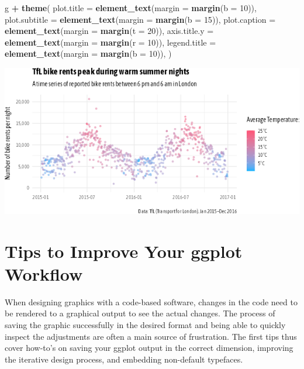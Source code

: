 \documentclass[
]{krantz}
\makeatletter
\newenvironment{Shaded}{\begin{snugshade}}{\end{snugshade}}
\newcommand{\AttributeTok}[1]{\textcolor[rgb]{0.27,0.27,0.27}{#1}}
\newcommand{\DecValTok}[1]{\textcolor[rgb]{0.06,0.06,0.06}{#1}}
\newcommand{\FunctionTok}[1]{\textcolor[rgb]{0.27,0.27,0.27}{\textbf{#1}}}
\newcommand{\NormalTok}[1]{#1}
\newcommand{\SpecialCharTok}[1]{\textcolor[rgb]{0.43,0.43,0.43}{\textbf{#1}}}
\newenvironment{kframe}{%
\medskip{}
\setlength{\fboxsep}{.8em}
 \def\at@end@of@kframe{}%
 \ifinner\ifhmode%
  \def\at@end@of@kframe{\end{minipage}}%
  \begin{minipage}{\columnwidth}%
 \fi\fi%
 \def\FrameCommand##1{\hskip\@totalleftmargin \hskip-\fboxsep
 \colorbox{shadecolor}{##1}\hskip-\fboxsep
     \hskip-\linewidth \hskip-\@totalleftmargin \hskip\columnwidth}%
 \MakeFramed {\advance\hsize-\width
   \@totalleftmargin\z@ \linewidth\hsize
   \@setminipage}}%
 {\par\unskip\endMakeFramed%
 \at@end@of@kframe}
\renewenvironment{Shaded}{\begin{kframe}}{\end{kframe}}
\makeatother
\begin{document}
\begin{Shaded}
\begin{Highlighting}[]
\NormalTok{g }\SpecialCharTok{+} \FunctionTok{theme}\NormalTok{(}
  \AttributeTok{plot.title =} \FunctionTok{element\_text}\NormalTok{(}\AttributeTok{margin =} \FunctionTok{margin}\NormalTok{(}\AttributeTok{b =} \DecValTok{10}\NormalTok{)),}
  \AttributeTok{plot.subtitle =} \FunctionTok{element\_text}\NormalTok{(}\AttributeTok{margin =} \FunctionTok{margin}\NormalTok{(}\AttributeTok{b =} \DecValTok{15}\NormalTok{)),}
  \AttributeTok{plot.caption =} \FunctionTok{element\_text}\NormalTok{(}\AttributeTok{margin =} \FunctionTok{margin}\NormalTok{(}\AttributeTok{t =} \DecValTok{20}\NormalTok{)),}
  \AttributeTok{axis.title.y =} \FunctionTok{element\_text}\NormalTok{(}\AttributeTok{margin =} \FunctionTok{margin}\NormalTok{(}\AttributeTok{r =} \DecValTok{10}\NormalTok{)),}
  \AttributeTok{legend.title =} \FunctionTok{element\_text}\NormalTok{(}\AttributeTok{margin =} \FunctionTok{margin}\NormalTok{(}\AttributeTok{b =} \DecValTok{10}\NormalTok{)),}
\NormalTok{)}
\end{Highlighting}
\end{Shaded}

\includegraphics{bookdown_files/figure-latex/05textMargins-1.png}

\hypertarget{tips-to-improve-your-ggplot-workflow}{%
\chapter{Tips to Improve Your ggplot Workflow}\label{tips-to-improve-your-ggplot-workflow}}

When designing graphics with a code-based software, changes in the code need to be rendered to a graphical output to see the actual changes. The process of saving the graphic successfully in the desired format and being able to quickly inspect the adjustments are often a main source of frustration. The first tips thus cover how-to's on saving your ggplot output in the correct dimension, improving the iterative design process, and embedding non-default typefaces.
\end{document}
